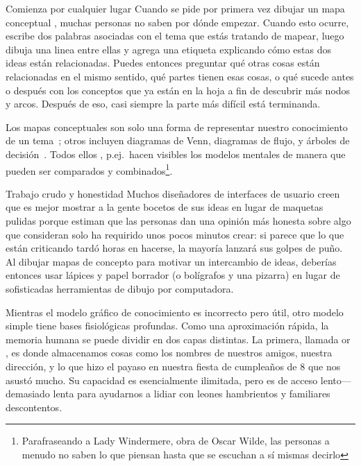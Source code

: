 \begin{aside}{Comienza por cualquier lugar}
  Cuando se pide por primera vez dibujar un mapa conceptual , muchas personas no saben por dónde empezar.
  Cuando esto ocurre,
  escribe dos palabras asociadas con el tema que estás tratando de mapear,
 luego dibuja una linea entre ellas y agrega una etiqueta explicando cómo estas dos ideas están relacionadas.
  Puedes entonces preguntar qué otras cosas están relacionadas en el mismo sentido,
  qué partes tienen esas cosas,
  o qué sucede antes o después con los conceptos que ya están en la hoja
  a fin de descubrir más nodos y arcos.
  Después de eso, casi siempre la parte más difícil está terminanda.
\end{aside}

Los mapas conceptuales son solo una forma de representar nuestro conocimiento de un tema~\cite{Eppl2006};
otros incluyen diagramas de Venn, diagramas de flujo, y árboles de decisión~\cite{Abel2009}.
Todos ellos ,
p.ej.\ hacen visibles los modelos mentales de manera que pueden ser comparados y combinados\footnote{Parafraseando a
 Lady Windermere, obra de Oscar Wilde,
las personas a menudo no saben lo que piensan hasta que se escuchan a sí mismas decirlo}.

\begin{aside}{Trabajo crudo y honestidad}
  Muchos diseñadores de interfaces de usuario creen que es mejor mostrar a la gente bocetos de sus ideas en lugar de maquetas pulidas
  porque estiman que  las personas dan una opinión más honesta sobre algo que 
  consideran solo ha requirido unos pocos minutos crear:
  si parece que lo que están criticando tardó horas en hacerse, 
  la mayoría lanzará sus golpes de puño.
  Al dibujar mapas de concepto para motivar un intercambio de ideas,
  deberías entonces usar lápices y papel borrador (o bolígrafos y una pizarra)
  en lugar de sofisticadas herramientas de dibujo por computadora.
\end{aside}


Mientras el modelo gráfico de conocimiento es incorrecto pero útil,
otro modelo simple tiene bases fisiológicas profundas.
Como una aproximación rápida,
la memoria humana se puede dividir en dos capas distintas.
La primera,
llamada 
or ,
es donde almacenamos cosas como los nombres de nuestros amigos,
nuestra dirección,
y lo que hizo el payaso en nuestra fiesta de cumpleaños de 8 que nos asustó mucho.
Su capacidad es esencialmente ilimitada,
pero es de acceso lento---demasiado lenta para ayudarnos a lidiar con leones hambrientos  y familiares descontentos.

